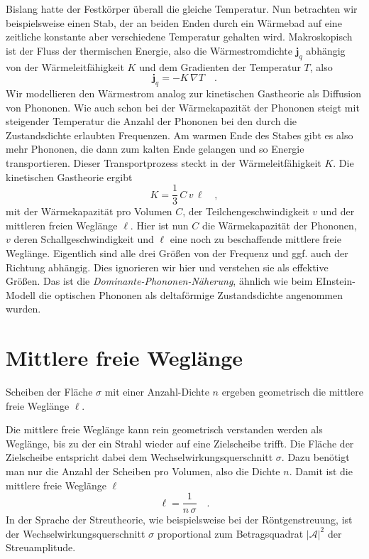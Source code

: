  Bislang hatte der Festkörper überall die gleiche Temperatur. Nun betrachten wir beispielsweise einen Stab, der an beiden Enden durch ein Wärmebad auf eine zeitliche konstante aber verschiedene Temperatur gehalten wird. Makroskopisch ist der Fluss der thermischen Energie, also die Wärmestromdichte $\mathbf{j}_q$ abhängig von der Wärmeleitfähigkeit $K$ und dem Gradienten der Temperatur $T$, also
\begin{equation}
    \mathbf{j}_q = - K \, \nabla T \quad .
\end{equation}
Wir modellieren den Wärmestrom analog zur kinetischen Gastheorie  als Diffusion von Phononen. Wie auch schon bei der Wärmekapazität der Phononen steigt mit steigender Temperatur die Anzahl der Phononen bei den durch die Zustandsdichte erlaubten Frequenzen. Am warmen Ende des Stabes gibt es also mehr Phononen, die dann zum kalten Ende gelangen und so Energie transportieren. Dieser Transportprozess steckt in der Wärmeleitfähigkeit $K$. Die kinetischen Gastheorie  ergibt
\begin{equation}
    K  = \frac{1}{3} \, C \, v \, \ell \quad , \label{eq:2_def_waermeleitf}
\end{equation}
mit der Wärmekapazität pro Volumen $C$, der Teilchengeschwindigkeit $v$ und der mittleren freien Weglänge $\ell$. Hier ist nun $C$ die Wärmekapazität der Phononen, $v$ deren Schallgeschwindigkeit und $\ell$ eine noch zu beschaffende mittlere freie Weglänge. Eigentlich sind alle drei Größen von der Frequenz und ggf. auch der Richtung abhängig. Dies ignorieren wir hier und verstehen sie als effektive Größen. Das ist die \emph{Dominante-Phononen-Näherung}, ähnlich wie beim EInstein-Modell die optischen Phononen als deltaförmige Zustandsdichte angenommen wurden.



\section*{Mittlere freie Weglänge}

\begin{marginfigure}
    \caption{Scheiben der Fläche $\sigma$ mit einer Anzahl-Dichte $n$ ergeben geometrisch die mittlere freie Weglänge $\ell$.}
     \label{fig:1_crosssection}
\end{marginfigure}

Die mittlere freie Weglänge kann rein geometrisch verstanden werden als Weglänge, bis zu der ein Strahl wieder auf eine Zielscheibe trifft. Die Fläche der Zielscheibe entspricht dabei dem Wechselwirkungsquerschnitt $\sigma$. Dazu benötigt man nur die Anzahl der Scheiben pro Volumen, also die Dichte $n$. Damit ist die mittlere freie Weglänge $\ell$
\begin{equation}
    \ell = \frac{1}{n \, \sigma} \quad .  \label{eq:1_def_weglaenge} 
\end{equation}
In der Sprache der Streutheorie, wie beispielsweise bei der Röntgenstreuung, ist der Wechselwirkungsquerschnitt $\sigma$ proportional zum Betragsquadrat $|\mathcal{A}|^2$ der Streuamplitude.

